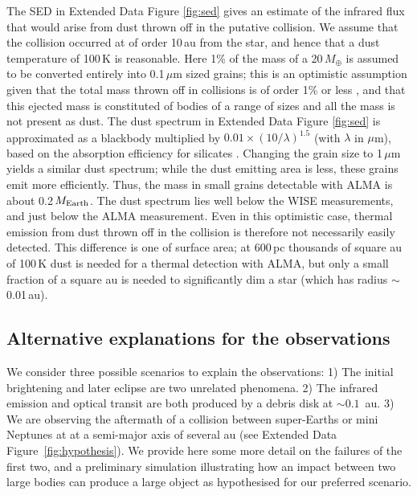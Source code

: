 \documentclass[sn-nature]{sn-jnl}%
\begin{document}
The SED in Extended Data Figure \ref{fig:sed} gives an estimate of the infrared flux that would arise from dust thrown off in the putative collision.
%
We assume that the collision occurred at of order 10\,au from the star, and hence that a dust temperature of 100\,K is reasonable.
%
Here 1\% of the mass of a 20\,$M_\oplus$ is assumed to be converted entirely into 0.1\,$\mu$m sized grains; this is an optimistic assumption given that the total mass thrown off in collisions is of order 1\% or less \citep{2012ApJ...745...79L}, and that this ejected mass is constituted of bodies of a range of sizes and all the mass is not present as dust.
%
The dust spectrum in Extended Data Figure \ref{fig:sed} is approximated as a blackbody multiplied by $0.01 \times (10 / \lambda)^{1.5}$ (with $\lambda$ in $\mu$m), based on the absorption efficiency for silicates \citep{1993ApJ...402..441L}.
%
Changing the grain size to 1\,$\mu$m yields a similar dust spectrum; while the dust emitting area is less, these grains emit more efficiently.
%
Thus, the mass in small grains detectable with ALMA is about 0.2\,$M_{\rm Earth}$.
%
The dust spectrum lies well below the WISE measurements, and just below the ALMA measurement. Even in this optimistic case, thermal emission from dust thrown off in the collision is therefore not necessarily easily detected.
%
This difference is one of surface area; at 600\,pc thousands of square au of 100\,K dust is needed for a thermal detection with ALMA, but only a small fraction of a square au is needed to significantly dim a star (which has radius $\sim$0.01\,au).

\subsection*{Alternative explanations for the observations}

We consider three possible scenarios to explain the observations: 1) The initial brightening and later eclipse are two unrelated phenomena.
%
2) The infrared emission and optical transit are both produced by a debris disk at $\sim0.1$~au.
%
3) We are observing the aftermath of a collision between super-Earths or mini Neptunes at at a semi-major axis of several au (see Extended Data Figure~\ref{fig:hypothesis}).
%
We provide here some more detail on the failures of the first two, and a preliminary simulation illustrating how an impact between two large bodies can produce a large object as hypothesised for our preferred scenario. 
\end{document}
